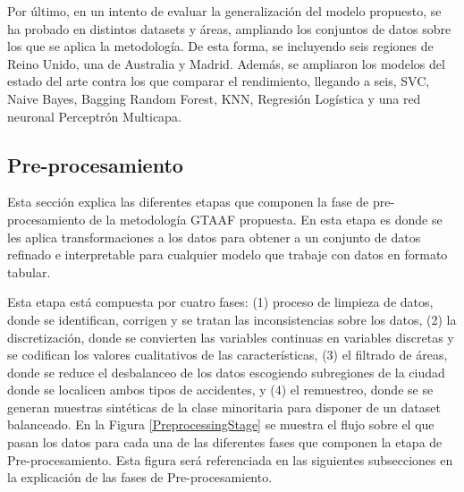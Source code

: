 Por último, en un intento de evaluar la generalización del modelo propuesto, se ha probado en distintos datasets y áreas, ampliando los conjuntos de datos sobre los que se aplica la metodología. De esta forma, se incluyendo seis regiones de Reino Unido, una de Australia y Madrid. Además, se ampliaron los modelos del estado del arte contra los que comparar el rendimiento, llegando a seis, SVC, Naive Bayes, Bagging Random Forest, KNN, Regresión Logística y una red neuronal Perceptrón Multicapa.

\subsection{Pre-procesamiento}

Esta sección explica las diferentes etapas que componen la fase de pre-procesamiento de la metodología GTAAF propuesta. En esta etapa es donde se les aplica transformaciones a los datos para obtener a un conjunto de datos refinado e interpretable para cualquier modelo que trabaje con datos en formato tabular. 

Esta etapa está compuesta por cuatro fases: (1) proceso de limpieza de datos, donde se identifican, corrigen y se tratan las inconsistencias sobre los datos, (2) la discretización, donde se convierten las variables continuas en variables discretas y se codifican los valores cualitativos de las características, (3) el filtrado de áreas, donde se reduce el desbalanceo de los datos escogiendo subregiones de la ciudad donde se localicen ambos tipos de accidentes, y (4) el remuestreo, donde se se generan muestras sintéticas de la clase minoritaria para disponer de un dataset balanceado. En la Figura \ref{PreprocessingStage} se muestra el flujo sobre el que pasan los datos para cada una de las diferentes fases que componen la etapa de Pre-procesamiento. Esta figura será referenciada en las siguientes subsecciones en la explicación de las fases de Pre-procesamiento.

